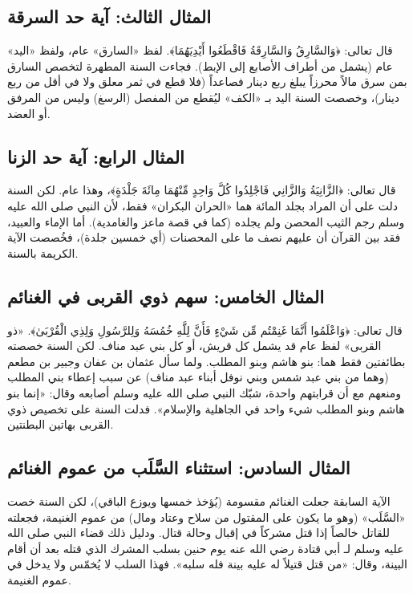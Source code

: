 \subsection{المثال الثالث: آية حد السرقة}
قال تعالى: ﴿وَالسَّارِقُ وَالسَّارِقَةُ فَاقْطَعُوا أَيْدِيَهُمَا﴾. لفظ «السارق» عام، ولفظ «اليد» عام (يشمل من أطراف الأصابع إلى الإبط). فجاءت السنة المطهرة لتخصص السارق بمن سرق مالاً محرزاً يبلغ ربع دينار فصاعداً (فلا قطع في ثمر معلق ولا في أقل من ربع دينار)، وخصصت السنة اليد بـ «الكف» ليُقطع من المفصل (الرسغ) وليس من المرفق أو العضد.

\subsection{المثال الرابع: آية حد الزنا}
قال تعالى: ﴿الزَّانِيَةُ وَالزَّانِي فَاجْلِدُوا كُلَّ وَاحِدٍ مِّنْهُمَا مِائَةَ جَلْدَةٍ﴾، وهذا عام. لكن السنة دلت على أن المراد بجلد المائة هما «الحران البكران» فقط، لأن النبي صلى الله عليه وسلم رجم الثيب المحصن ولم يجلده (كما في قصة ماعز والغامدية). أما الإماء والعبيد، فقد بين القرآن أن عليهم نصف ما على المحصنات (أي خمسين جلدة)، فخُصصت الآية الكريمة بالسنة.

\subsection{المثال الخامس: سهم ذوي القربى في الغنائم}
قال تعالى: ﴿وَاعْلَمُوا أَنَّمَا غَنِمْتُم مِّن شَيْءٍ فَأَنَّ لِلَّهِ خُمُسَهُ وَلِلرَّسُولِ وَلِذِي الْقُرْبَىٰ﴾. «ذو القربى» لفظ عام قد يشمل كل قريش، أو كل بني عبد مناف. لكن السنة خصصته بطائفتين فقط هما: بنو هاشم وبنو المطلب. ولما سأل عثمان بن عفان وجبير بن مطعم (وهما من بني عبد شمس وبني نوفل أبناء عبد مناف) عن سبب إعطاء بني المطلب ومنعهم مع أن قرابتهم واحدة، شبّك النبي صلى الله عليه وسلم أصابعه وقال: «إنما بنو هاشم وبنو المطلب شيء واحد في الجاهلية والإسلام». فدلت السنة على تخصيص ذوي القربى بهاتين البطنتين.

\subsection{المثال السادس: استثناء السَّلَب من عموم الغنائم}
الآية السابقة جعلت الغنائم مقسومة (يُؤخذ خمسها ويوزع الباقي)، لكن السنة خصت «السَّلَب» (وهو ما يكون على المقتول من سلاح وعتاد ومال) من عموم الغنيمة، فجعلته للقاتل خالصاً إذا قتل مشركاً في إقبال وحالة قتال. ودليل ذلك قضاء النبي صلى الله عليه وسلم لـ أبي قتادة رضي الله عنه يوم حنين بسلب المشرك الذي قتله بعد أن أقام البينة، وقال: «من قتل قتيلاً له عليه بينة فله سلبه». فهذا السلب لا يُخمّس ولا يدخل في عموم الغنيمة.


